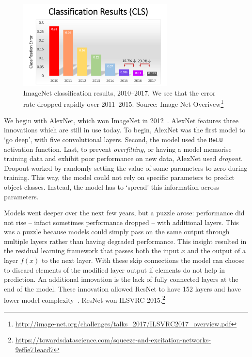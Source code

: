 \documentclass[12pt, a4paper, oneside, headinclude, footinclude]{article}
\begin{document}
\begin{figure}
    \centering
\includegraphics[width=0.7\textwidth]{imagenet_classification_results.png}
    \caption[ImageNet classification results, 2010--2017]{ImageNet
    classification results, 2010--2017. We see that the error rate dropped
    rapidly over 2011--2015. Source: Image Net
    Overivew\footnote{\url{http://image-net.org/challenges/talks_2017/ILSVRC2017_overview.pdf}}\label{fig:imagenetoverview}}
\end{figure}

We begin with AlexNet, which won ImageNet in 2012~\cite{NIPS2012_4824}.
AlexNet features three innovations which are still in use today. To begin,
AlexNet was the first model to `go deep', with five convolutional layers.
Second, the model used the \texttt{ReLU} activation function. Last, to prevent
\textit{overfitting}, or having a model memorise training data and exhibit
poor performance on new data, AlexNet used \textit{dropout}. Dropout worked by
randomly setting the value of some parameters to zero during training. This
way, the model could not rely on specific parameters to predict object
classes. Instead, the model has to `spread' this information across
parameters.

Models went deeper over the next few years, but a puzzle arose: performance
did not rise -- infact sometimes performance dropped -- with additional
layers. This was a puzzle because models could simply pass on the same output
through multiple layers rather than having degraded performance. This insight
resulted in the residual learning framework that passes both the input $x$ and
the output of a layer $f(x)$ to the next layer. With these skip connections
the model can choose to discard elements of the modified layer output if
elements do not help in prediction. An additional innovation is the lack of
fully connected layers at the end of the model. These innovation allowed ResNet
to have 152 layers and have lower model complexity~\cite{he2016deep}. ResNet
won ILSVRC
2015.\footnote{\url{https://towardsdatascience.com/squeeze-and-excitation-networks-9ef5e71eacd7}}
\end{document}
